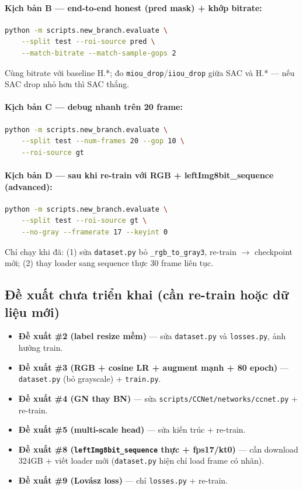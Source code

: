 \documentclass[12pt,a4paper]{article}
\begin{document}
\paragraph{Kịch bản B — end-to-end honest (pred mask) + khớp bitrate:}
\begin{lstlisting}[language=bash]
python -m scripts.new_branch.evaluate \
    --split test --roi-source pred \
    --match-bitrate --match-sample-gops 2
\end{lstlisting}
Cùng bitrate với baseline H.*; đo \texttt{miou\_drop}/\texttt{iiou\_drop} giữa SAC
và H.* — nếu SAC drop nhỏ hơn thì SAC thắng.

\paragraph{Kịch bản C — debug nhanh trên 20 frame:}
\begin{lstlisting}[language=bash]
python -m scripts.new_branch.evaluate \
    --split test --num-frames 20 --gop 10 \
    --roi-source gt
\end{lstlisting}

\paragraph{Kịch bản D — sau khi re-train với RGB + leftImg8bit\_sequence (advanced):}
\begin{lstlisting}[language=bash]
python -m scripts.new_branch.evaluate \
    --split test --roi-source gt \
    --no-gray --framerate 17 --keyint 0
\end{lstlisting}
Chỉ chạy khi đã: (1) sửa \texttt{dataset.py} bỏ \texttt{\_rgb\_to\_gray3}, re-train
$\to$ checkpoint mới; (2) thay loader sang sequence thực 30 frame liên tục.

\subsection{Đề xuất chưa triển khai (cần re-train hoặc dữ liệu mới)}

\begin{itemize}[leftmargin=2em]
  \item \textbf{Đề xuất \#2 (label resize mềm)} — sửa \texttt{dataset.py} và
        \texttt{losses.py}, ảnh hưởng train.
  \item \textbf{Đề xuất \#3 (RGB + cosine LR + augment mạnh + 80 epoch)} —
        \texttt{dataset.py} (bỏ grayscale) + \texttt{train.py}.
  \item \textbf{Đề xuất \#4 (GN thay BN)} — sửa
        \texttt{scripts/CCNet/networks/ccnet.py} + re-train.
  \item \textbf{Đề xuất \#5 (multi-scale head)} — sửa kiến trúc + re-train.
  \item \textbf{Đề xuất \#8 (\texttt{leftImg8bit\_sequence} thực + fps17/kt0)} —
        cần download 324GB + viết loader mới (\texttt{dataset.py} hiện chỉ load
        frame có nhãn).
  \item \textbf{Đề xuất \#9 (Lovász loss)} — chỉ \texttt{losses.py} + re-train.
\end{itemize}
\end{document}
